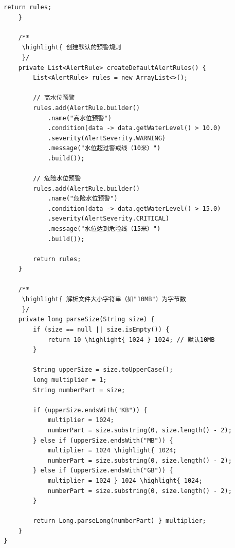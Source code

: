 \begin{lstlisting}[style=java]
        return rules;
    }
    
    /**
     \highlight{ 创建默认的预警规则
     }/
    private List<AlertRule> createDefaultAlertRules() {
        List<AlertRule> rules = new ArrayList<>();
        
        // 高水位预警
        rules.add(AlertRule.builder()
            .name("高水位预警")
            .condition(data -> data.getWaterLevel() > 10.0)
            .severity(AlertSeverity.WARNING)
            .message("水位超过警戒线（10米）")
            .build());
        
        // 危险水位预警
        rules.add(AlertRule.builder()
            .name("危险水位预警")
            .condition(data -> data.getWaterLevel() > 15.0)
            .severity(AlertSeverity.CRITICAL)
            .message("水位达到危险线（15米）")
            .build());
        
        return rules;
    }
    
    /**
     \highlight{ 解析文件大小字符串（如"10MB"）为字节数
     }/
    private long parseSize(String size) {
        if (size == null || size.isEmpty()) {
            return 10 \highlight{ 1024 } 1024; // 默认10MB
        }
        
        String upperSize = size.toUpperCase();
        long multiplier = 1;
        String numberPart = size;
        
        if (upperSize.endsWith("KB")) {
            multiplier = 1024;
            numberPart = size.substring(0, size.length() - 2);
        } else if (upperSize.endsWith("MB")) {
            multiplier = 1024 \highlight{ 1024;
            numberPart = size.substring(0, size.length() - 2);
        } else if (upperSize.endsWith("GB")) {
            multiplier = 1024 } 1024 \highlight{ 1024;
            numberPart = size.substring(0, size.length() - 2);
        }
        
        return Long.parseLong(numberPart) } multiplier;
    }
}
\end{lstlisting}


